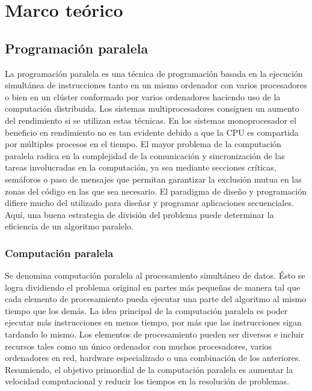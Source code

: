 \chapter{Marco teórico}
\label{chapter:marco:teorico}


\section{Programación paralela}

La programación paralela es una técnica de programación basada en la ejecución simultánea de instrucciones tanto en un mismo ordenador con varios procesadores o bien en un clúster conformado por varios ordenadores haciendo uso de la computación distribuida.
Los sistemas multiprocesadores consiguen un aumento del rendimiento si se utilizan estas técnicas. En los sistemas monoprocesador el beneficio en rendimiento no es tan evidente debido a que la CPU es compartida por múltiples procesos en el tiempo.
\newline El mayor problema de la computación paralela radica en la complejidad de la comunicación y sincronización de las tareas involucradas en la computación, ya sea mediante secciones críticas, semáforos o paso de mensajes que permitan garantizar la exclusión mutua en las zonas del código en las que sea necesario.
\newline El paradigma de diseño y programación difiere mucho del utilizado para diseñar y programar aplicaciones secuenciales. Aquí, una buena estrategia de división del problema puede determinar la eficiencia de un algoritmo paralelo.

\subsection{Computación paralela}

Se denomina computación paralela al procesamiento simultáneo de datos. Ésto se logra dividiendo el problema original en partes más pequeñas de manera tal que cada elemento de procesamiento pueda ejecutar una parte del algoritmo al mismo tiempo que los demás. \newline La idea principal de la computación paralela es poder ejecutar más instrucciones en menos tiempo, por más que las instrucciones sigan tardando lo mismo.
Los elementos de procesamiento pueden ser diversos e incluir recursos tales como un único ordenador con muchos procesadores, varios ordenadores en red, hardware especializado o una combinación de los anteriores.
Resumiendo, el objetivo primordial de la computación paralela es aumentar la velocidad computacional y reducir los tiempos en la resolución de problemas.

